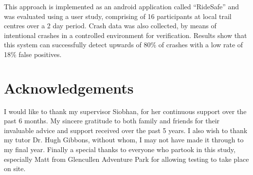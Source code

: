 \documentclass[a4paper,oneside,12pt]{book}
\begin{document}
This approach is implemented as an android application called “RideSafe” and was evaluated using a user study, comprising of 16 participants at local trail centres over a 2 day period. Crash data was also collected, by means of intentional crashes in a controlled environment  for verification.  Results show that this system can successfully detect upwards of 80\% of crashes with a low rate of 18\% false positives.


\newpage
\onehalfspacing\raggedright %

\section*{\Huge{Acknowledgements}}

I would like to thank my supervisor Siobhan, for her continuous support over the past 6 months.
My sincere gratitude to both family and friends for their invaluable advice and support received over the past 5 years.
I also wish to thank my tutor Dr. Hugh Gibbons, without whom, I may not have made it through to my final year.
Finally a special thanks to everyone who partook in this study, especially Matt from Glencullen Adventure Park for allowing testing to take place on site.


\tableofcontents
\listoffigures
\listoftables
\lstlistoflistings
\newpage


\mainmatter









\appendix
\renewcommand{\thechapter}{A\arabic{chapter}}

\end{document}
